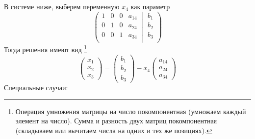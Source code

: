 В системе ниже, выберем переменную $x_4$ как параметр
\[
\left(\left.
\begin{matrix}
1& 0&0& a_{14}\\
0& 1&0& a_{24}\\
0& 0&1& a_{34}\\
\end{matrix}
\:\right|\:
\begin{matrix}
b_1\\
b_2\\
b_3\\
\end{matrix}
\right)
\]
Тогда решения имеют вид%
\footnote{Операция умножения матрицы на число покомпонентная (умножаем каждый элемент на число).
Сумма и разность двух матриц покомпонентная (складываем или вычитаем числа на одних и тех же позициях).}
\[
\begin{pmatrix}
x_1\\
x_2\\
x_3
\end{pmatrix}
=
\begin{pmatrix}
b_1\\
b_2\\
b_3
\end{pmatrix}
-
x_4
\begin{pmatrix}
a_{14}\\
a_{24}\\
a_{34}
\end{pmatrix}
\]
Специальные случаи:
